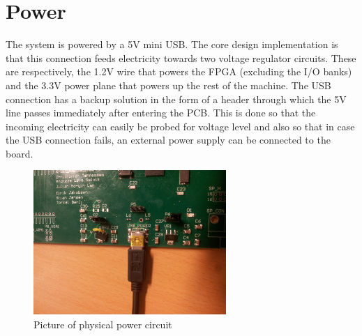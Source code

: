 \documentclass[../main/report.tex]{subfiles}
\begin{document}
\section{Power}

The system is powered by a 5V mini USB.
The core design implementation is that this connection feeds electricity towards two voltage regulator circuits.
These are respectively, the 1.2V wire that powers the FPGA (excluding the I/O banks) and the 3.3V power plane that powers up the rest of the machine.
The USB connection has a backup solution in the form of a header through which the 5V line passes immediately after entering the PCB.
This is done so that the incoming electricity can easily be probed for voltage level and also so that in case the USB connection fails, an external power supply can be connected to the board.

\begin{figure}[H]
	\centering
	\includegraphics[width=0.65\textwidth]{../pcb/assets/power.jpg}
	\caption{Picture of physical power circuit}
	\label{fig:power-circuit}
\end{figure}
\end{document}
